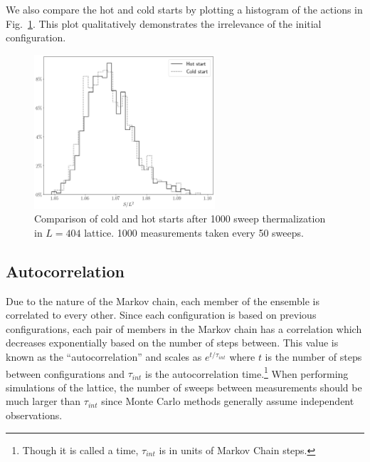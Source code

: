 We also compare the hot and cold starts by plotting a histogram of the actions in Fig.~\ref{fig:coldstart}. This plot qualitatively demonstrates the irrelevance of the initial configuration.
\begin{figure}[h]
  \centering
    \includegraphics[width=0.6\textwidth]{imgs/coldstart.png}
  \caption{\label{fig:coldstart} Comparison of cold and hot starts after 1000 sweep thermalization in $L=404$ lattice. 1000 measurements taken every 50 sweeps.}
\end{figure}

\subsection{Autocorrelation}
Due to the nature of the Markov chain, each member of the ensemble is correlated to every other. Since each configuration is based on previous configurations, each pair of members in the Markov chain has a correlation which decreases exponentially based on the number of steps between. This value is known as the ``autocorrelation'' and scales as $e^{t/\tau_{int}}$ where $t$ is the number of steps between configurations and $\tau_{int}$ is the autocorrelation time.\footnote{Though it is called a time, $\tau_{int}$ is in units of Markov Chain steps.} When performing simulations of the lattice, the number of sweeps between measurements should be much larger than $\tau_{int}$ since Monte Carlo methods generally assume independent observations.

